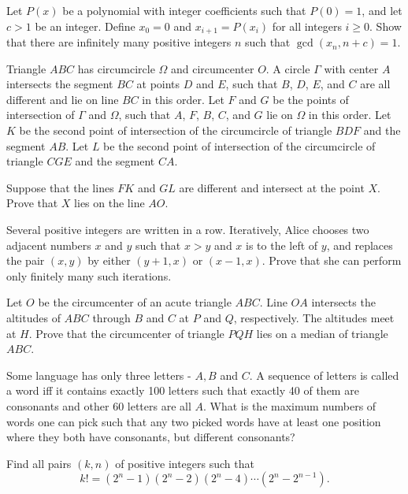 \documentclass[11pt]{scrartcl}
\begin{document}
\begin{problem}[8463873707700703744]
Let $P(x)$ be a polynomial with integer coefficients such that $P(0)=1$, and let $c > 1$ be an integer. Define $x_0=0$ and $x_{i+1} = P(x_i)$ for all integers $i \ge 0$. Show that there are infinitely many positive integers $n$ such that $\gcd (x_n, n+c)=1$.
\end{problem}
\begin{problem}[3440185808972009200]
Triangle $ABC$ has circumcircle $\Omega$ and circumcenter $O$. A circle $\Gamma$ with center $A$ intersects the segment $BC$ at points $D$ and $E$, such that $B$, $D$, $E$, and $C$ are all different and lie on line $BC$ in this order. Let $F$ and $G$ be the points of intersection of $\Gamma$ and $\Omega$, such that $A$, $F$, $B$, $C$, and $G$ lie on $\Omega$ in this order. Let $K$ be the second point of intersection of the circumcircle of triangle $BDF$ and the segment $AB$. Let $L$ be the second point of intersection of the circumcircle of triangle $CGE$ and the segment $CA$.

Suppose that the lines $FK$ and $GL$ are different and intersect at the point $X$. Prove that $X$ lies on the line $AO$.
\end{problem}
\begin{problem}[406898817113614]
	Several positive integers are written in a row. Iteratively, Alice chooses two adjacent numbers $x$ and $y$ such that $x>y$ and $x$ is to the left of $y$, and replaces the pair $(x,y)$ by either $(y+1,x)$ or $(x-1,x)$. Prove that she can perform only finitely many such iterations.
\end{problem}
\begin{problem}[1366302870241512636]
Let $O$ be the circumcenter of an acute triangle $ABC$. Line $OA$ intersects the altitudes of $ABC$ through $B$ and $C$ at $P$ and $Q$, respectively. The altitudes meet at $H$. Prove that the circumcenter of triangle $PQH$ lies on a median of triangle $ABC$.
\end{problem}
\begin{problem}[1736102587052874498]
Some language has only three letters - $A, B$ and $C$. A sequence of letters is called a word iff it contains exactly 100 letters such that exactly 40 of them are consonants and other 60 letters are all $A$. What is the maximum numbers of words one can pick such that any two picked words have at least one position where they both have consonants, but different consonants?
\end{problem}
\begin{problem}[16776483958513]
Find all pairs $(k,n)$ of positive integers such that\[ k!=(2^n-1)(2^n-2)(2^n-4)\cdots(2^n-2^{n-1}). \]
\end{problem}
\end{document}
